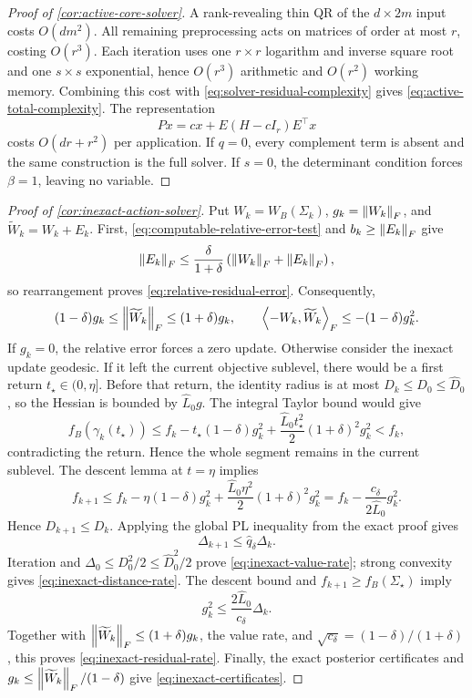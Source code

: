 \begin{proof}[Proof of \cref{cor:active-core-solver}]
A rank-revealing thin QR of the \(d\times2m\) input costs \(O(dm^2)\).
All remaining preprocessing acts on matrices of order at most \(r\), costing
\(O(r^3)\).  Each iteration uses one \(r\times r\) logarithm and inverse
square root and one \(s\times s\) exponential, hence \(O(r^3)\) arithmetic
and \(O(r^2)\) working memory.  Combining this cost with
\cref{eq:solver-residual-complexity} gives
\cref{eq:active-total-complexity}.  The representation
\[
  Px=cx+E(H-cI_r)E^\top x
\]
costs \(O(dr+r^2)\) per application.  If \(q=0\), every complement term is
absent and the same construction is the full solver.  If \(s=0\), the
determinant condition forces \(\beta=1\), leaving no variable.
\end{proof}

\begin{proof}[Proof of \cref{cor:inexact-action-solver}]
Put \(W_k=W_B(\Sigma_k)\), \(g_k=\left\lVert W_k\right\rVert_F\), and
\(\widetilde W_k=W_k+E_k\).  First,
\cref{eq:computable-relative-error-test} and \(b_k\ge\left\lVert E_k\right\rVert_F\) give
\[
  \left\lVert E_k\right\rVert_F
  \le\frac{\delta}{1+\delta}
      \left(\left\lVert W_k\right\rVert_F+\left\lVert E_k\right\rVert_F\right),
\]
so rearrangement proves \cref{eq:relative-residual-error}.  Consequently,
\[
  (1-\delta)g_k\le\left\lVert \widetilde W_k\right\rVert_F
  \le(1+\delta)g_k,
\qquad
  \left\langle -W_k,\widetilde W_k\right\rangle_F
  \le-(1-\delta)g_k^2.
\]
If \(g_k=0\), the relative error forces a zero update.  Otherwise consider
the inexact update geodesic.  If it left the current objective sublevel,
there would be a first return \(t_\star\in(0,\eta]\).  Before that return,
the identity radius is at most \(D_k\le D_0\le\widehat D_0\), so the Hessian
is bounded by \(\widehat L_0g\).  The integral Taylor bound would give
\[
  f_B(\gamma_k(t_\star))
  \le f_k-t_\star(1-\delta)g_k^2
      +\frac{\widehat L_0t_\star^2}{2}(1+\delta)^2g_k^2
  <f_k,
\]
contradicting the return.  Hence the whole segment remains in the current
sublevel.  The descent lemma at \(t=\eta\) implies
\[
  f_{k+1}
  \le f_k-\eta(1-\delta)g_k^2
  +\frac{\widehat L_0\eta^2}{2}(1+\delta)^2g_k^2
  =f_k-\frac{c_\delta}{2\widehat L_0}g_k^2.
\]
Hence \(D_{k+1}\le D_k\).  Applying the global PL inequality from the exact
proof gives
\[
  \Delta_{k+1}\le\widehat q_\delta\Delta_k.
\]
Iteration and
\(\Delta_0\le D_0^2/2\le\widehat D_0^2/2\) prove
\cref{eq:inexact-value-rate}; strong convexity gives
\cref{eq:inexact-distance-rate}.  The descent bound and
\(f_{k+1}\ge f_B(\Sigma_\star)\) imply
\[
  g_k^2\le\frac{2\widehat L_0}{c_\delta}\Delta_k.
\]
Together with \(\left\lVert \widetilde W_k\right\rVert_F\le(1+\delta)g_k\), the value rate, and
\(\sqrt{c_\delta}=(1-\delta)/(1+\delta)\), this proves
\cref{eq:inexact-residual-rate}.  Finally, the exact posterior certificates and
\(g_k\le\left\lVert \widetilde W_k\right\rVert_F/(1-\delta)\) give
\cref{eq:inexact-certificates}.
\end{proof}

